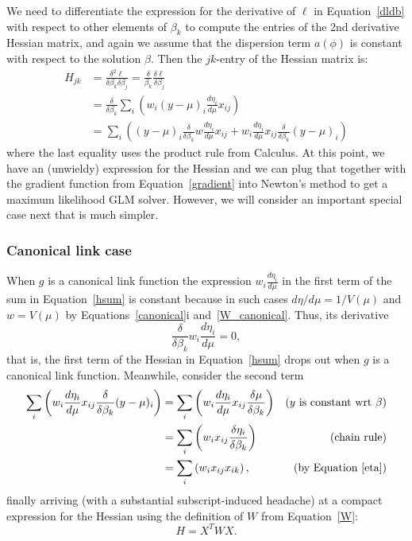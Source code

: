 \documentclass[10pt]{article} %
\begin{document}
We need to differentiate the expression for the derivative of $\ell$ in
Equation~\ref{dldb} with respect to other elements
of $\beta_k$ to compute the entries of the 2nd derivative Hessian matrix,
and again we assume that the dispersion term $a(\phi)$ is constant
with respect to the solution $\beta$. Then the $jk$-entry of the
Hessian matrix is:
\begin{align}
H_{jk} &= \frac{\delta^2\ell}{\delta\beta_k\delta\beta_j}
 = \frac{\delta}{\beta_k}\frac{\delta\ell}{\delta\beta_j} \nonumber\\
&=
\frac{\delta}{\delta\beta_k}
\sum_i\left(
w_i(y-\mu)_i\frac{d\eta_i}{d\mu}x_{ij} \right)\nonumber \\
&= \sum_i\left(
(y-\mu)_i
\frac{\delta}{\delta\beta_k}
w\frac{d\eta_i}{d\mu}x_{ij}
+
w_i\frac{d\eta_i}{d\mu}x_{ij}\frac{\delta}{\delta\beta_k}(y-\mu)_i \label{hsum}
\right)
\end{align}
where the last equality uses the product rule from Calculus.
At this point, we have an (unwieldy) expression for the Hessian and
we can plug that together with the gradient function from Equation~\ref{gradient}
into Newton's method to get a maximum likelihood GLM solver.
However, we will consider an important special case next that is much simpler.

\subsubsection*{Canonical link case}
When $g$ is a canonical link function
the expression $w_i\frac{d\eta_i}{d\mu}$ in the
first term of the sum in Equation~\ref{hsum}
is constant because in such cases
$d\eta/d\mu=1/V(\mu)$ and
$w=V(\mu)$ 
by Equations~\ref{canonical}i and~\ref{W_canonical}. Thus, its derivative
\[
\frac{\delta}{\delta\beta_k} w_i\frac{d\eta_i}{d\mu} = 0,
\]
that is, the first term of the Hessian in Equation~\ref{hsum}
drops out when $g$ is a canonical link function.
Meanwhile, consider the second term
\begin{align*}
\sum_i\left(
w_i\frac{d\eta_i}{d\mu}x_{ij}\frac{\delta}{\delta\beta_k}(y-\mu)_i
\right)  &=
\sum_i\left(
w_i\frac{d\eta_i}{d\mu}x_{ij}\frac{\delta\mu}{\delta\beta_k} \right) &\mbox{($y$ is constant wrt $\beta$)}  \\
&= 
\sum_i\left(
w_ix_{ij}\frac{\delta\eta_i}{\delta\beta_k} \right)&\mbox{(chain rule)}\\
&= 
\sum_i\left(
w_ix_{ij}x_{ik} \right), &\mbox{(by Equation \ref{eta})}
\end{align*}
finally arriving (with a substantial subscript-induced headache) at a compact
expression for the Hessian using the definition of $W$ from Equation~\ref{W}:
\begin{equation}\label{Hessian}
H = X^T W X.
\end{equation}
\end{document}
